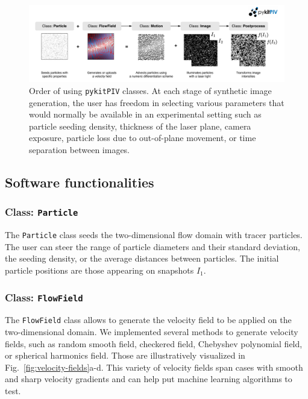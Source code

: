 \documentclass[a4paper,fleqn]{cas-dc}
\newcommand{ \kamila}[1]{\color{blue}{Kamila: #1} \color{black}}
\begin{document}
\kamila{Mention that image properties are Monte Carlo -generated! We can show the span of conditions generated.}

\begin{figure}[t]
\centering
\vspace{-0.4 in}
\includegraphics[width=\textwidth]{pykitPIV-modules.pdf}
\vspace{10 pt}
\caption{\footnotesize Order of using \texttt{pykitPIV} classes. At each stage of synthetic image generation, the user has freedom in selecting various parameters that would normally be available in an experimental setting such as particle seeding density, thickness of the laser plane, camera exposure, particle loss due to out-of-plane movement, or time separation between images.}
\label{fig:pykitPIV-overview}
\end{figure}

\subsection{Software functionalities}

\subsubsection{Class: \texttt{Particle}} \label{sec:class-Particle}

The \texttt{Particle} class seeds the two-dimensional flow domain with tracer particles. The user can steer the range of particle diameters and their standard deviation, the seeding density, or the average distances between particles. The initial particle positions are those appearing on snapshots $I_1$.

\subsubsection{Class: \texttt{FlowField}} \label{sec:class-FlowField}

The \texttt{FlowField} class allows to generate the velocity field to be applied on the two-dimensional domain. We implemented several methods to generate velocity fields, such as random smooth field, checkered field, Chebyshev polynomial field, or spherical harmonics field. Those are illustratively visualized in Fig.~\ref{fig:velocity-fields}a-d. This variety of velocity fields span cases with smooth and sharp velocity gradients and can help put machine learning algorithms to test.
\end{document}
